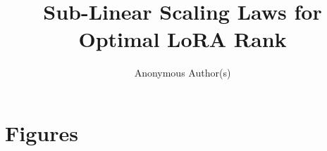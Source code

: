 \documentclass{article}
\title{Sub-Linear Scaling Laws for Optimal LoRA Rank}
\author{
  Anonymous Author(s)
}
\date{}
\begin{document}
\maketitle

\begin{abstract}

\end{abstract}












\clearpage
\appendix
\section{Figures}

\end{document}
